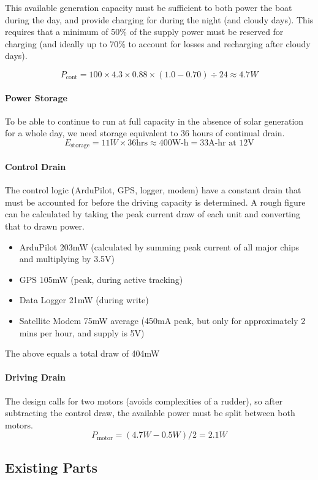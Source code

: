 This available generation capacity must be sufficient to both power the boat during the day, and provide charging for during the night (and cloudy days). This requires that a minimum of 50\% of the supply power must be reserved for charging (and ideally up to 70\% to account for losses and recharging after cloudy days).

$$
P_{\text{cont}} = 100 \times 4.3 \times 0.88 \times (1.0 - 0.70) \div 24 \approx 4.7W
$$

\paragraph{Power Storage}
To be able to continue to run at full capacity in the absence of solar generation for a whole day, we need storage equivalent to 36 hours of continual drain.
$$
E_{\text{storage}} = 11W \times 36\text{hrs} \approx 400\text{W-h} = 33\text{A-hr at 12V}
$$

\paragraph{Control Drain}
The control logic (ArduPilot, GPS, logger, modem) have a constant drain that must be accounted for before the driving capacity is determined. A rough figure can be calculated by taking the peak current draw of each unit and converting that to drawn power.
\begin{itemize}
\item{ArduPilot} 203mW (calculated by summing peak current of all major chips and multiplying by 3.5V)
\item{GPS} 105mW (peak, during active tracking)
\item{Data Logger} 21mW (during write)
\item{Satellite Modem} 75mW average (450mA peak, but only for approximately 2 mins per hour, and supply is 5V)
\end{itemize}
The above equals a total draw of 404mW

\paragraph{Driving Drain}
The design calls for two motors (avoids complexities of a rudder), so after subtracting the control draw, the available power must be split between both motors.
$$
P_{\text{motor}} = \left(4.7W - 0.5W\right) / 2 = 2.1W
$$

\subsection{Existing Parts}

